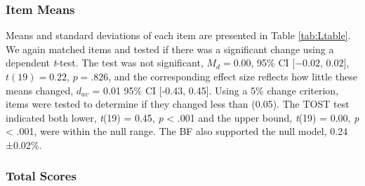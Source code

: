 \documentclass[english,man, mask]{apa6}
\theoremstyle{definition}
\theoremstyle{definition}
\theoremstyle{definition}
\theoremstyle{remark}
\begin{document}
\subsubsection{Item Means}\label{item-means-1}

Means and standard deviations of each item are presented in Table
\ref{tab:Ltable}. We again matched items and tested if there was a
significant change using a dependent \emph{t}-test. The test was not
significant, \(M_d = 0.00\), 95\% CI \([-0.02\), \(0.02]\),
\(t(19) = 0.22\), \(p = .826\), and the corresponding effect size
reflects how little these means changed, \(d_{av}\) = 0.01 95\% CI
{[}-0.43, 0.45{]}. Using a 5\% change criterion, items were tested to
determine if they changed less than (0.05). The TOST test indicated both
lower, \emph{t}(19) = 0.45, \emph{p} \textless{} .001 and the upper
bound, \emph{t}(19) = 0.00, \emph{p} \textless{} .001, were within the
null range. The BF also supported the null model, 0.24 ±0.02\%.

\subsubsection{Total Scores}\label{total-scores-1}
\end{document}

